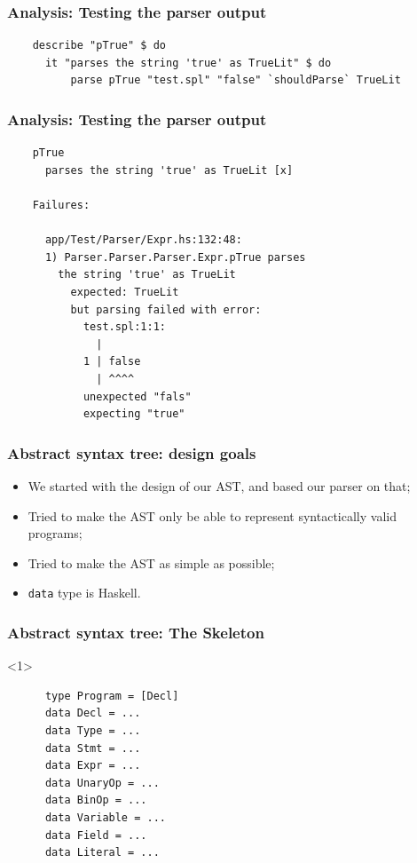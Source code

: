 \documentclass{beamer}
\begin{document}
\begin{frame}[fragile]
  \frametitle{Analysis: Testing the parser output}
  
  \begin{verbatim}
    describe "pTrue" $ do
      it "parses the string 'true' as TrueLit" $ do
          parse pTrue "test.spl" "false" `shouldParse` TrueLit
  \end{verbatim}
\end{frame}

\begin{frame}[fragile]
  \frametitle{Analysis: Testing the parser output}
  
  \begin{verbatim}
    pTrue
      parses the string 'true' as TrueLit [x]

    Failures:

      app/Test/Parser/Expr.hs:132:48: 
      1) Parser.Parser.Parser.Expr.pTrue parses 
        the string 'true' as TrueLit
          expected: TrueLit
          but parsing failed with error:
            test.spl:1:1:
              |
            1 | false
              | ^^^^
            unexpected "fals"
            expecting "true"
  \end{verbatim}
\end{frame}


\begin{frame}
  \frametitle{Abstract syntax tree: design goals}

  \begin{itemize}
    \item We started with the design of our AST, and based our parser on that;
    \item Tried to make the AST only be able to represent syntactically valid programs;
    \item Tried to make the AST as simple as possible;
    \item \texttt{data} type is Haskell.
  \end{itemize}
\end{frame}

\begin{frame}[fragile]
  \frametitle{Abstract syntax tree: The Skeleton}
  \begin{onlyenv}<1>
    \begin{verbatim}
      type Program = [Decl] 
      data Decl = ... 
      data Type = ... 
      data Stmt = ... 
      data Expr = ... 
      data UnaryOp = ... 
      data BinOp = ... 
      data Variable = ...
      data Field = ...
      data Literal = ...
    \end{verbatim}
  \end{onlyenv}
\end{frame}
\end{document}
